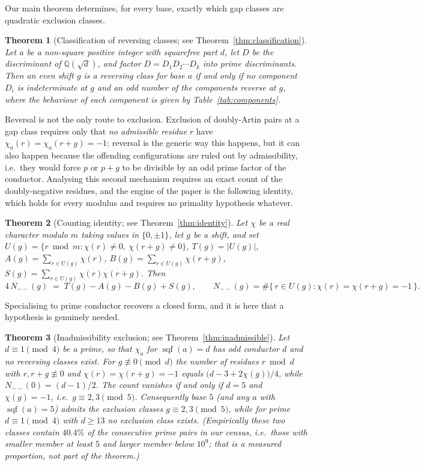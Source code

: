 \documentclass[11pt,reqno]{amsart}
\theoremstyle{plain}
\newtheorem{theorem}{Theorem}
\theoremstyle{definition}
\DeclareMathOperator{\sqf}{sqf}
\newcommand{\Q}{\mathbb{Q}}
\begin{document}
Our main theorem determines, for every base, exactly which gap classes are
quadratic exclusion classes.

\begin{theorem}[Classification of reversing classes; see
Theorem~\ref{thm:classification}]
Let $a$ be a non-square positive integer with squarefree part $d$, let $D$ be
the discriminant of $\Q(\sqrt{d})$, and factor $D = D_1 D_2 \cdots D_k$ into
prime discriminants. Then an even shift $g$ is a reversing class for base $a$
if and only if no component $D_i$ is \emph{indeterminate} at $g$ and an odd
number of the components \emph{reverse} at $g$, where the behaviour of each
component is given by Table~\ref{tab:components}.
\end{theorem}

Reversal is not the only route to exclusion. Exclusion of doubly-Artin pairs
at a gap class requires only that \emph{no admissible residue} $r$ have
$\chi_a(r) = \chi_a(r+g) = -1$; reversal is the generic way this happens, but
it can also happen because the offending configurations are ruled out by
admissibility, i.e.\ they would force $p$ or $p+g$ to be divisible by an odd
prime factor of the conductor. Analysing this second mechanism requires an
exact count of the doubly-negative residues, and the engine of the paper is
the following identity, which holds for every modulus and requires no
primality hypothesis whatever.

\begin{theorem}[Counting identity; see Theorem~\ref{thm:identity}]
Let $\chi$ be a real character modulo $m$ taking values in $\{0, \pm 1\}$, let
$g$ be a shift, and set
$U(g) = \{ r \bmod m : \chi(r) \neq 0,\ \chi(r+g) \neq 0 \}$,
$T(g) = |U(g)|$, $A(g) = \sum_{r \in U(g)} \chi(r)$,
$B(g) = \sum_{r \in U(g)} \chi(r+g)$,
$S(g) = \sum_{r \in U(g)} \chi(r)\chi(r+g)$. Then
\[
  4\, N_{--}(g) \;=\; T(g) - A(g) - B(g) + S(g),
  \qquad
  N_{--}(g) = \#\{\, r \in U(g) : \chi(r) = \chi(r+g) = -1 \,\}.
\]
\end{theorem}

Specialising to prime conductor recovers a closed form, and it is here that a
hypothesis is genuinely needed.

\begin{theorem}[Inadmissibility exclusion; see Theorem~\ref{thm:inadmissible}]
Let $d \equiv 1 \pmod 4$ be a prime, so that $\chi_a$ for $\sqf(a) = d$ has
odd conductor $d$ and no reversing classes exist. For $g \not\equiv 0 \pmod d$
the number of residues $r \bmod d$ with $r, r+g \not\equiv 0$ and
$\chi(r) = \chi(r+g) = -1$ equals $\bigl(d - 3 + 2\chi(g)\bigr)/4$, while
$N_{--}(0) = (d-1)/2$. The count vanishes if and only if $d = 5$ and
$\chi(g) = -1$, i.e.\ $g \equiv 2, 3 \pmod 5$. Consequently base $5$ (and any
$a$ with $\sqf(a) = 5$) admits the exclusion classes $g \equiv 2, 3 \pmod 5$,
while for prime $d \equiv 1 \pmod 4$ with $d \ge 13$ no exclusion class
exists. (Empirically these two classes contain $40.4\%$ of the consecutive
prime pairs in our census, i.e.\ those with smaller member at least $5$ and
larger member below $10^9$; that is a measured proportion, not part of the
theorem.)
\end{theorem}
\end{document}
